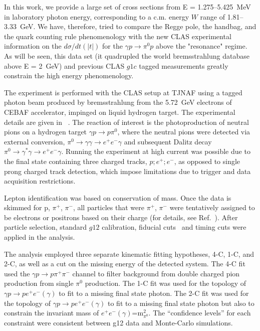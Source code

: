 \documentclass[aps,prc,twocolumn,floatfix,showpacs,preprintnumbers,amsmath,amssymb,superscriptaddress]{revtex4-1}
\begin{document}
In this work, we provide a large set of cross sections from 
E = 1.275--5.425~MeV in laboratory photon energy, 
corresponding to a c.m. energy $W$ range of 1.81--3.33~GeV.  
We have, therefore, tried to 
compare the Regge pole, the
handbag, and the quark counting rule phenomenology with the 
new CLAS experimental information on the $d\sigma/dt(|t|)$ 
for the $\gamma p\to\pi^0p$ above the "resonance" regime. As will 
be seen, this data set (it quadrupled the world bremsstrahlung 
database above E = 2~GeV) and previous CLAS $g1c$ tagged 
measurements greatly constrain the high energy phenomenology.

The experiment is performed with the CLAS setup 
at TJNAF using a tagged photon beam produced by bremsstrahlung 
from the 5.72~GeV electrons of CEBAF accelerator, impinged on 
liquid hydrogen target. The experimental details are given 
in ~\cite{g12}. The reaction of interest is the photoproduction 
of neutral pions on a hydrogen target $\gamma p\to p\pi^0$, where
the neutral pions were detected via external conversion, $\pi^0 \rightarrow \gamma \gamma \rightarrow e^+e^-\gamma$ and subsequent Dalitz decay $\pi^0\to \gamma^\ast
\gamma\to e^+e^-\gamma$. 
Running the experiment at high current was possible due to the final state containing three charged tracks, $p;e^+;e^-$, as opposed to single prong charged track detection, which impose limitations due to trigger and data acquisition restrictions.

Lepton identification was based on conservation of mass. Once 
the data is skimmed for p, $\pi^+$, $\pi^-$, all particles that 
were $\pi^+$, $\pi^-$ were tentatively assigned to be electrons 
or positrons based on their charge (for details, see 
Ref.~\cite{Kunkel}).  After particle selection, standard $g12$ 
calibration, fiducial cuts~\cite{g12} and timing cuts were 
applied in the analysis.

The analysis employed three separate kinematic fitting 
hypotheses, 4-C, 1-C, and 2-C, as well as a cut on the missing 
energy of the detected system. The 4-C fit used the $\gamma p\to 
p\pi^+\pi^-$ channel to filter background from double charged 
pion production from single $\pi^0$ production. The 1-C fit
was used for the topology of $\gamma p\to pe^+e^-(\gamma)$ to 
fit to a missing final state photon.  The 2-C fit was used for 
the topology of $\gamma p\to pe^+e^-(\gamma)$ to fit to a 
missing final state photon but also to constrain the invariant 
mass of $e^+e^-(\gamma)$=m$^2_{\pi^0}$. The ``confidence levels''
for each constraint were consistent between g12 data 
and Monte-Carlo simulations.
\end{document}
